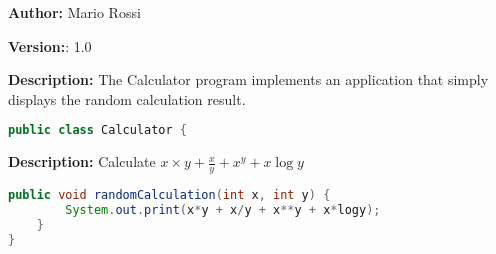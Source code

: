 \textbf{Author:} Mario Rossi

\textbf{Version:}: 1.0

\textbf{Description:}
 The Calculator program implements an application that simply displays the random calculation result.  

\begin{lstlisting}[language=Java]
public class Calculator {
\end{lstlisting}
\textbf{Description:}
Calculate $x\times y + \frac{x}{y} + x^y + x\log y$

\begin{lstlisting}[language=Java]
    public void randomCalculation(int x, int y) {
        System.out.print(x*y + x/y + x**y + x*logy);
    }
}
\end{lstlisting}
